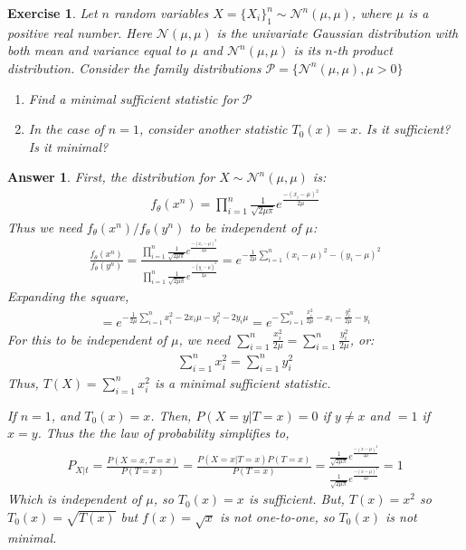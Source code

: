 \documentclass[12pt]{article}
\theoremstyle{colon}
\newtheorem{exercise}{Exercise}
\newtheorem*{answer}{Answer}
\begin{document}
\clearpage

\begin{exercise}
  Let $n$ random variables $X = \{ X_i \}_1^n \sim \mathcal{N}^n(\mu, \mu)$, where $\mu$ is a positive real number. Here $\mathcal{N}(\mu, \mu)$ is the univariate Gaussian distribution with both mean and variance equal to $\mu$ and $\mathcal{N}^n(\mu, \mu)$ is its $n$-th product distribution. Consider the family distributions $\mathcal{P} = \{ \mathcal{N}^n(\mu, \mu), \mu > 0 \}$
  \begin{enumerate}[label=\arabic*)]
    \item Find a minimal sufficient statistic for $\mathcal{P}$
    \item In the case of $n = 1$, consider another statistic $T_0(x) = x$. Is it sufficient? Is it minimal?
  \end{enumerate}
\end{exercise}

\begin{answer}
  First, the distribution for $X \sim \mathcal{N}^n(\mu, \mu)$ is:
  \begin{gather*}
    f_\theta(x^n) = \prod_{i=1}^n \frac{1}{\sqrt{2\mu\pi}} e^{\frac{-(x_i - \mu)^2}{2\mu}}
  \end{gather*}
  Thus we need $f_\theta(x^n)/f_\theta(y^n)$ to be independent of $\mu$:
  \begin{gather*}
    \frac{f_\theta(x^n)}{f_\theta(y^n)} = \frac{\prod_{i=1}^n \frac{1}{\sqrt{2\mu\pi}} e^{\frac{-(x_i - \mu)^2}{2\mu}}}{ \prod_{i=1}^n \frac{1}{\sqrt{2\mu\pi}} e^{\frac{-(y_i - \mu)^2}{2\mu}}} = e^{-\frac{1}{2\mu} \sum_{i=1}^n (x_i - \mu)^2 - (y_i - \mu)^2}
  \end{gather*}
  Expanding the square,
  \begin{gather*}
    = e^{-\frac{1}{2\mu} \sum_{i=1}^n x_i^2 - 2x_i\mu - y_i^2 - 2y_i\mu} = e^{-\sum_{i=1}^n \frac{x_i^2}{2\mu} - x_i - \frac{y_i^2}{2\mu} - y_i}
  \end{gather*}
  For this to be independent of $\mu$, we need $\sum_{i=1}^n \frac{x_i^2}{2\mu} = \sum_{i=1}^n \frac{y_i^2}{2\mu}$, or:
  \begin{gather*}
    \sum_{i=1}^n x_i^2 = \sum_{i=1}^n y_i^2
  \end{gather*}
  Thus, $T(X) = \sum_{i=1}^n x_i^2$ is a minimal sufficient statistic.

  If $n = 1$, and  $T_0(x) = x$. Then, $P(X = y | T = x) = 0$ if $y \neq x$ and $= 1$ if $x = y$. Thus the the law of probability simplifies to,
  \begin{gather*}
    P_{X|t} = \frac{P(X = x, T = x)}{P(T = x)} = \frac{P(X = x | T = x)P(T = x)}{P(T = x)} = \frac{\frac{1}{\sqrt{2\mu\pi}} e^{\frac{-(x - \mu)^2}{2\mu}}}{\frac{1}{\sqrt{2\mu\pi}} e^{\frac{-(x - \mu)^2}{2\mu}}} = 1
  \end{gather*}
  Which is independent of $\mu$, so $T_0(x) = x$ is sufficient. But, $T(x) = x^2$ so $T_0(x) = \sqrt{T(x)}$ but $f(x) = \sqrt{x}$ is not one-to-one, so $T_0(x)$ is not minimal.
\end{answer}
\end{document}
